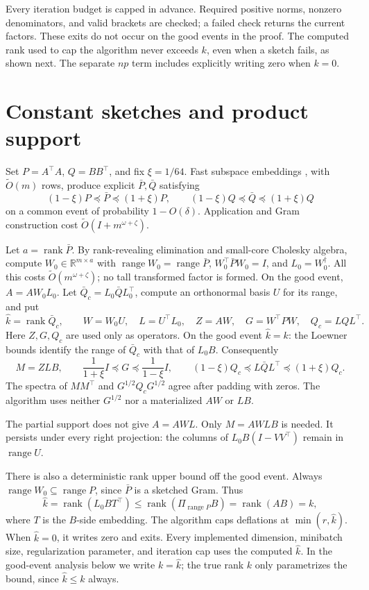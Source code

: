 \documentclass[11pt]{article}
\newcommand{\R}{\mathbb R}
\newcommand{\rank}{\operatorname{rank}}
\newcommand{\range}{\operatorname{range}}
\begin{document}
Every iteration budget is capped in advance. Required positive norms,
nonzero denominators, and valid brackets are checked; a failed check
returns the current factors. These exits do not occur on the good
events in the proof. The computed rank used to cap the algorithm never
exceeds \(k\), even when a sketch fails, as shown next. The separate
\(np\) term includes explicitly writing zero when \(k=0\).

\section{Constant sketches and product support}
Set \(P=A^\top A\), \(Q=BB^\top\), and fix \(\xi=1/64\).
Fast subspace embeddings \cite{cnw}, with
\(\widetilde O(m)\) rows, produce explicit \(\bar P,\bar Q\) satisfying
\[
 (1-\xi)P\preceq\bar P\preceq(1+\xi)P,\qquad
 (1-\xi)Q\preceq\bar Q\preceq(1+\xi)Q
\]
on a common event of probability \(1-O(\delta)\).
Application and Gram construction cost
\(\widetilde O(I+m^{\omega+\zeta})\).

Let \(a=\rank\bar P\). By rank-revealing elimination and small-core
Cholesky algebra, compute \(W_0\in\R^{m\times a}\) with
\(\range W_0=\range\bar P\), \(W_0^\top\bar P W_0=I\),
and \(L_0=W_0^\dagger\). All this costs
\(\widetilde O(m^{\omega+\zeta})\); no tall transformed factor is formed.
On the good event, \(A=AW_0L_0\).
Let \(\bar Q_c=L_0\bar QL_0^\top\), compute an orthonormal basis \(U\)
for its range, and put
\[
 \widehat k=\rank\bar Q_c,\qquad
 W=W_0U,\quad L=U^\top L_0,\quad Z=AW,\quad
 G=W^\top PW,\quad Q_c=LQL^\top .
\]
Here \(Z,G,Q_c\) are used only as operators.
On the good event \(\widehat k=k\): the Loewner bounds identify the
range of \(\bar Q_c\) with that of \(L_0B\).
Consequently
\[
 M=ZLB,\qquad
 \frac1{1+\xi}I\preceq G\preceq\frac1{1-\xi}I,\qquad
 (1-\xi)Q_c\preceq L\bar QL^\top\preceq(1+\xi)Q_c .
\]
The spectra of \(MM^\top\) and \(G^{1/2}Q_cG^{1/2}\) agree after
padding with zeros. The algorithm uses neither \(G^{1/2}\) nor a
materialized \(AW\) or \(LB\).

The partial support does not give \(A=AWL\). Only \(M=AWLB\) is
needed. It persists under every right projection: the columns of
\(L_0B(I-VV^\top)\) remain in \(\range U\).

There is also a deterministic rank upper bound off the good event.
Always \(\range W_0\subseteq\range P\), since \(\bar P\) is a
sketched Gram. Thus
\[
 \widehat k=\rank(L_0BT^\top)
 \leq\rank(\Pi_{\range P}B)=\rank(AB)=k ,
\]
where \(T\) is the \(B\)-side embedding.
The algorithm caps deflations at \(\min(r,\widehat k)\).
When \(\widehat k=0\), it writes zero and exits.
Every implemented dimension, minibatch size, regularization parameter,
and iteration cap uses the computed \(\widehat k\). In the good-event
analysis below we write \(k=\widehat k\); the true rank \(k\) only
parametrizes the bound, since \(\widehat k\leq k\) always.
\end{document}
